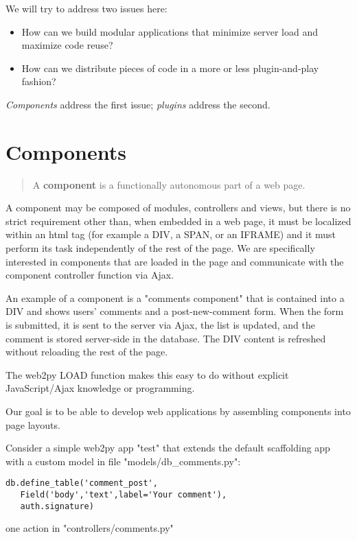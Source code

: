 \documentclass[justified,sixbynine,notoc]{tufte-book}
\def\inxx#1{\index{#1}}
\begin{document}
\begin{fullwidth}
We will try to address two issues here:

\begin{itemize}
\item How can we build modular applications that minimize server load and maximize code reuse?

\item How can we distribute pieces of code in a more or less plugin-and-play fashion?
\end{itemize}

{\it Components} address the first issue; {\it plugins} address the second.

\goodbreak\section{Components}

\inxx{load}
\inxx{LOAD}
\inxx{Ajax}

\begin{quote}A {\bf component} is a functionally autonomous part of a web page.\end{quote}
A component may be composed of modules, controllers and views, but there is no strict requirement other than, when embedded in a web page, it must be localized within an html tag (for example a DIV, a SPAN, or an IFRAME) and it must perform its task independently of the rest of the page. We are specifically interested in components that are loaded in the page and communicate with the component controller function via Ajax.

An example of a component is a "comments component" that is contained into a DIV and shows users' comments and a post-new-comment form. When the form is submitted, it is sent to the server via Ajax, the list is updated, and the comment is stored server-side in the database. The DIV content is refreshed without reloading the rest of the page.

The web2py LOAD function makes this easy to do without explicit JavaScript/Ajax knowledge or programming.

Our goal is to be able to develop web applications by assembling components into page layouts.

Consider a simple web2py app "test" that extends the default scaffolding app with a custom model in file "models/db\_comments.py":

\begin{lstlisting}
db.define_table('comment_post',
   Field('body','text',label='Your comment'),
   auth.signature)
\end{lstlisting}
\noindent one action in "controllers/comments.py"


\end{fullwidth}
\end{document}
